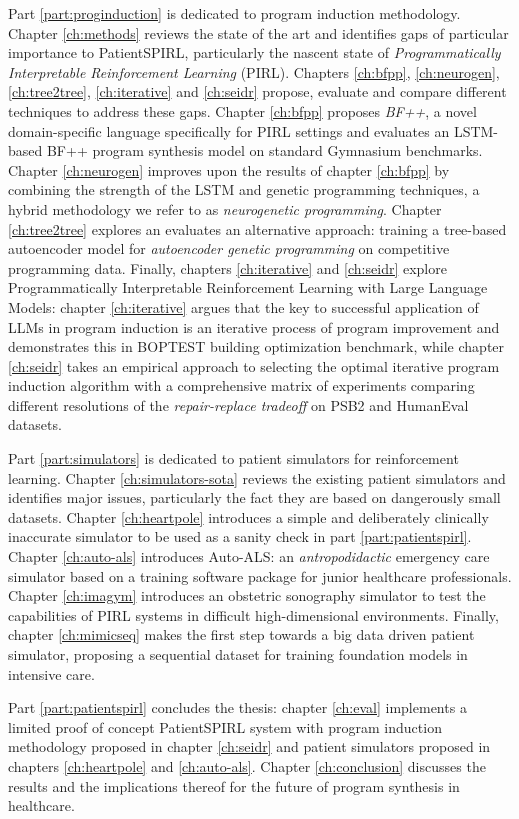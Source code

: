 Part \ref{part:proginduction} is dedicated to program induction methodology.
Chapter \ref{ch:methods} reviews the state of the art and identifies gaps of particular importance to PatientSPIRL, particularly the nascent state of \emph{Programmatically Interpretable Reinforcement Learning} (PIRL).
Chapters \ref{ch:bfpp}, \ref{ch:neurogen}, \ref{ch:tree2tree}, \ref{ch:iterative} and \ref{ch:seidr} propose, evaluate and compare different techniques to address these gaps.
Chapter \ref{ch:bfpp} proposes \emph{BF++}, a novel domain-specific language specifically for PIRL settings and evaluates an LSTM-based BF++ program synthesis model on standard Gymnasium \cite{towersGymnasiumStandardInterface2024} benchmarks.
Chapter \ref{ch:neurogen} improves upon the results of chapter \ref{ch:bfpp} by combining the strength of the LSTM and genetic programming techniques, a hybrid methodology we refer to as \emph{neurogenetic programming}.
Chapter \ref{ch:tree2tree} explores an evaluates an alternative approach: training a tree-based autoencoder model for \emph{autoencoder genetic programming} on competitive programming data.
Finally, chapters \ref{ch:iterative} and \ref{ch:seidr} explore Programmatically Interpretable Reinforcement Learning with Large Language Models: chapter \ref{ch:iterative} argues that the key to successful application of LLMs in program induction is an iterative process of program improvement and demonstrates this in BOPTEST building optimization benchmark, while chapter \ref{ch:seidr} takes an empirical approach to selecting the optimal iterative program induction algorithm with a comprehensive matrix of experiments comparing different resolutions of the \emph{repair-replace tradeoff} on PSB2 and HumanEval datasets.

Part \ref{part:simulators} is dedicated to patient simulators for reinforcement learning.
Chapter \ref{ch:simulators-sota} reviews the existing patient simulators and identifies major issues, particularly the fact they are based on dangerously small datasets.
Chapter \ref{ch:heartpole} introduces a simple and deliberately clinically inaccurate simulator to be used as a sanity check in part \ref{part:patientspirl}.
Chapter \ref{ch:auto-als} introduces Auto-ALS: an \emph{antropodidactic} emergency care simulator based on a training software package for junior healthcare professionals.
Chapter \ref{ch:imagym} introduces an obstetric sonography simulator to test the capabilities of PIRL systems in difficult high-dimensional environments.
Finally, chapter \ref{ch:mimicseq} makes the first step towards a big data driven patient simulator, proposing a sequential dataset for training foundation models in intensive care.

Part \ref{part:patientspirl} concludes the thesis: chapter \ref{ch:eval} implements a limited proof of concept PatientSPIRL system with program induction methodology proposed in chapter \ref{ch:seidr} and patient simulators proposed in chapters \ref{ch:heartpole} and \ref{ch:auto-als}.
Chapter \ref{ch:conclusion} discusses the results and the implications thereof for the future of program synthesis in healthcare.